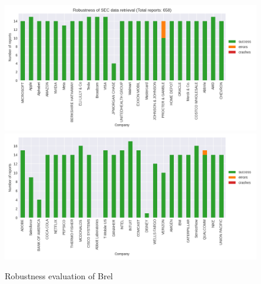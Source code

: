 \begin{figure}[H]
    \centering
    \includegraphics[width=1\textwidth]{images/robustness_1.png}
    \includegraphics[width=1\textwidth]{images/robustness_2.png}
    \caption{Robustness evaluation of Brel}
    \label{fig:robustness}
\end{figure}



